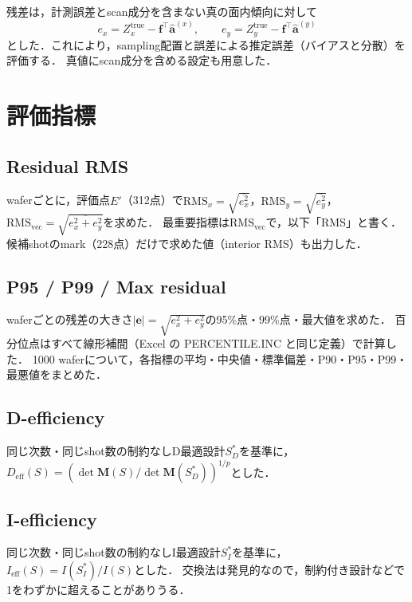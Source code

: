 \documentclass[10.5pt,a4paper]{ltjsarticle}
\begin{document}
残差は，計測誤差とscan成分を含まない真の面内傾向に対して
\begin{equation}
  e_x=Z_x^\text{true}-\bm{f}^\top\hat{\bm{a}}^{(x)},\qquad e_y=Z_y^\text{true}-\bm{f}^\top\hat{\bm{a}}^{(y)}
\end{equation}
とした．これにより，sampling配置と誤差による推定誤差（バイアスと分散）を評価する．
真値にscan成分を含める設定も用意した．

\section{評価指標}

\subsection{Residual RMS}

waferごとに，評価点$E'$（312点）で$\mathrm{RMS}_x=\sqrt{\overline{e_x^2}}$，$\mathrm{RMS}_y=\sqrt{\overline{e_y^2}}$，$\mathrm{RMS}_\text{vec}=\sqrt{\overline{e_x^2+e_y^2}}$を求めた．
最重要指標は$\mathrm{RMS}_\text{vec}$で，以下「RMS」と書く．候補shotのmark（228点）だけで求めた値（interior RMS）も出力した．

\subsection{P95 / P99 / Max residual}

waferごとの残差の大きさ$|\bm{e}|=\sqrt{e_x^2+e_y^2}$の95\%点・99\%点・最大値を求めた．
百分位点はすべて線形補間（Excel の PERCENTILE.INC と同じ定義）で計算した．
1000 waferについて，各指標の平均・中央値・標準偏差・P90・P95・P99・最悪値をまとめた．

\subsection{D-efficiency}

同じ次数・同じshot数の制約なしD最適設計$S_D^*$を基準に，$D_\text{eff}(S)=\left(\det\bm{M}(S)/\det\bm{M}(S_D^*)\right)^{1/p}$とした．

\subsection{I-efficiency}

同じ次数・同じshot数の制約なしI最適設計$S_I^*$を基準に，$I_\text{eff}(S)=I(S_I^*)/I(S)$とした．
交換法は発見的なので，制約付き設計などで1をわずかに超えることがありうる．
\end{document}
